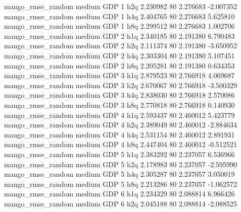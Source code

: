 mango_rmse_random     medium      GDP                 1                  h2q  2.230982 80       2.276683          -2.007352
mango_rmse_random     medium      GDP                 1                  h4q  2.404765 80       2.276683           5.625810
mango_rmse_random     medium      GDP                 1                  h8q  2.299512 80       2.276683           1.002706
mango_rmse_random     medium      GDP                 2                  h1q  2.340185 80       2.191380           6.790483
mango_rmse_random     medium      GDP                 2                  h2q  2.111374 80       2.191380          -3.650952
mango_rmse_random     medium      GDP                 2                  h4q  2.303304 80       2.191380           5.107451
mango_rmse_random     medium      GDP                 2                  h8q  2.205281 80       2.191380           0.634353
mango_rmse_random     medium      GDP                 3                  h1q  2.879523 80       2.766918           4.069687
mango_rmse_random     medium      GDP                 3                  h2q  2.670067 80       2.766918          -3.500329
mango_rmse_random     medium      GDP                 3                  h4q  2.838030 80       2.766918           2.570086
mango_rmse_random     medium      GDP                 3                  h8q  2.770818 80       2.766918           0.140930
mango_rmse_random     medium      GDP                 4                  h1q  2.593437 80       2.460012           5.423779
mango_rmse_random     medium      GDP                 4                  h2q  2.389049 80       2.460012          -2.884634
mango_rmse_random     medium      GDP                 4                  h4q  2.531154 80       2.460012           2.891931
mango_rmse_random     medium      GDP                 4                  h8q  2.447404 80       2.460012          -0.512521
mango_rmse_random     medium      GDP                 5                  h1q  2.383292 80       2.237057           6.536966
mango_rmse_random     medium      GDP                 5                  h2q  2.178983 80       2.237057          -2.595990
mango_rmse_random     medium      GDP                 5                  h4q  2.305287 80       2.237057           3.050019
mango_rmse_random     medium      GDP                 5                  h8q  2.213286 80       2.237057          -1.062572
mango_rmse_random     medium      GDP                 6                  h1q  2.234329 80       2.088814           6.966426
mango_rmse_random     medium      GDP                 6                  h2q  2.045188 80       2.088814          -2.088525
